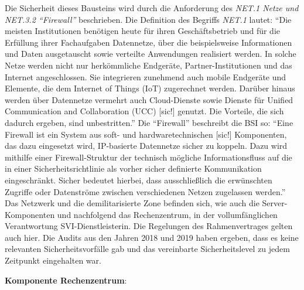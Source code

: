 Die Sicherheit dieses Bausteins wird durch die Anforderung des \textit{NET.1 Netze und NET.3.2 \enquote{Firewall}} beschrieben. Die Definition des Begriffs \textit{NET.1} lautet: \enquote{Die meisten Institutionen benötigen heute für ihren Geschäftsbetrieb und für die Erfüllung ihrer Fachaufgaben Datennetze, über die beispielsweise Informationen und Daten ausgetauscht sowie verteilte Anwendungen realisiert	werden. In solche Netze werden nicht nur herkömmliche Endgeräte, Partner-Institutionen und das Internet angeschlossen. Sie integrieren zunehmend auch mobile Endgeräte und Elemente, die dem Internet of Things (IoT) zugerechnet werden. Darüber hinaus werden über Datennetze vermehrt auch Cloud-Dienste sowie Dienste für Unified	Communication and Collaboration (UCC) [sic!] genutzt. Die Vorteile, die sich dadurch ergeben, sind unbestritten.}\autocite[][S.\,669]{bundesamt_fur_sicherheit_in_der_informationstechnik_bsi_it-grundschutz-kompendium_2020} Die \enquote{Firewall} beschreibt die \ac{BSI} so: \enquote{Eine Firewall ist ein System aus soft- und hardwaretechnischen [sic!] Komponenten, das dazu eingesetzt wird, IP-basierte Datennetze sicher zu koppeln. Dazu wird mithilfe einer Firewall-Struktur der technisch mögliche Informationsfluss auf die in einer Sicherheitsrichtlinie als vorher sicher definierte Kommunikation eingeschränkt. Sicher bedeutet hierbei, dass ausschließlich die erwünschten Zugriffe oder Datenströme zwischen verschiedenen Netzen zugelassen werden.}\autocite[][S.\,711]{bundesamt_fur_sicherheit_in_der_informationstechnik_bsi_it-grundschutz-kompendium_2020} Das Netzwerk und die demilitarisierte Zone befinden sich, wie auch die Server-Komponenten und nachfolgend das Rechenzentrum, in der vollumfänglichen Verantwortung \ac{SVI}-Dienstleisterin. Die Regelungen des Rahmenvertrages gelten auch hier. Die Audits aus den Jahren 2018 und 2019 haben ergeben, dass es keine relevanten Sicherheitsvorfälle gab und das vereinbarte Sicherheitslevel zu jedem Zeitpunkt eingehalten war. 
\par
\textbf{Komponente Rechenzentrum}:
\par
